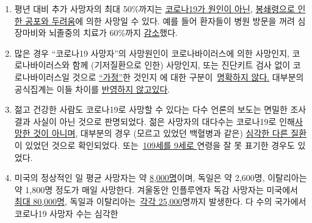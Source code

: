 \begin{enumerate}
{  스트레스}인지 명확하게 밝혀지지 않은
  \href{https://www.hsj.co.uk/commissioning/thousands-of-extra-deaths-outside-hospital-not-attributed-to-covid-19/7027459.article}{상황}이다.
\item
  평년 대비 추가 사망자의 최대 50\%까지는
  \href{https://www.thetimes.co.uk/edition/news/coronavirus-record-weekly-death-toll-as-fearful-patients-avoid-hospitals-bm73s2tw3}{코로나19가
  원인이 아닌},
  \href{https://www.telegraph.co.uk/global-health/science-and-disease/two-new-waves-deaths-break-nhs-new-analysis-warns/}{봉쇄령으로
  인한 공포와 두려움}에 의한 사망일 수 있다. 예를 들어 환자들이 병원
  방문을 꺼려 심장마비와 뇌졸중의 치료가 60\%까지
  \href{https://www.nytimes.com/2020/04/06/well/live/coronavirus-doctors-hospitals-emergency-care-heart-attack-stroke.html}{감소}했다.
\item
  많은 경우 ``코로나19 사망자''의 사망원인이 코로나바이러스에 의한
  사망인지, 코로나바이러스와 함께 (기저질환으로 인한) 사망인지, 또는
  진단키트 검사 없이 코로나바이러스일 것으로
  \href{https://www.youtube.com/watch?v=V0lIWZpiRU0}{``가정''}한 것인지
  에 대한
  구분이~\href{https://spectator.us/understand-report-figures-covid-deaths/}{명확하지
  않다.} 대부분의 공식집계는 이들 차이를
  \href{https://www.hsj.co.uk/coronavirus/systematic-reviews-to-discover-true-cause-of-outbreak-deaths/7027491.article}{반영하지
  않고있다}.
\item
  젊고 건강한 사람도 코로나19로 사망할 수 있다는 다수 언론의 보도는
  면밀한 조사 결과 사실이 아닌 것으로 판명되었다. 젊은 사망자의 대다수는
  코로나19로
  인해\href{https://www.dailymail.co.uk/news/article-8193487/Coroner-refuses-rule-COVID-19-cause-death-six-week-old-Connecticut-baby.html}{사망한
  것이 아니며}, 대부분의 경우 (모르고 있었던 백혈병과 같은)
  \href{https://sports.yahoo.com/spanish-football-coach-francisco-garcia-163153573.html}{심각한
  다른 질환}이 있었던 것으로 확인되었다.
  또는~\href{https://www.tagesanzeiger.ch/bund-muss-in-seiner-todesfallstatistik-fehler-korrigieren-584308129723}{109세를
  9세로 }연령을 잘 못 표기한 경우도 있었다.
\item
  미국의 정상적인 일 평균 사망자는 약
  \href{https://www.cdc.gov/mmwr/volumes/68/wr/mm6826a5.htm}{8,000명}이며,
  독일은 약 2,600명, 이탈리아는 약 1,800명 정도가 매일 사망한다.
  겨울동안 인플루엔자 독감 사망자는 미국에서
  \href{https://www.statnews.com/2018/09/26/cdc-us-flu-deaths-winter/}{최대
  80,000명}, 독일과
  이탈리아는~\href{https://www.sciencedirect.com/science/article/pii/S1201971219303285}{각각
  25,000}명까지 발생한다. 다 수의 국가에서 코로나19 사망자 수는 심각한

\end{enumerate}
